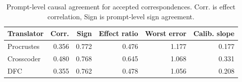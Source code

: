 \begin{table}[t]
\centering
\small
\begin{tabular}{lrrrrr}
\toprule
Translator & Corr. & Sign & Effect ratio & Worst error & Calib. slope \\
\midrule
Procrustes & 0.356 & 0.772 & 0.476 & 1.177 & 0.177 \\
Crosscoder & 0.480 & 0.768 & 0.645 & 1.068 & 0.331 \\
DFC & 0.355 & 0.762 & 0.478 & 1.056 & 0.208 \\
\bottomrule
\end{tabular}
\caption{Prompt-level causal agreement for accepted correspondences. Corr. is effect correlation, Sign is prompt-level sign agreement.}
\label{tab:table_5_4_signatures}
\end{table}